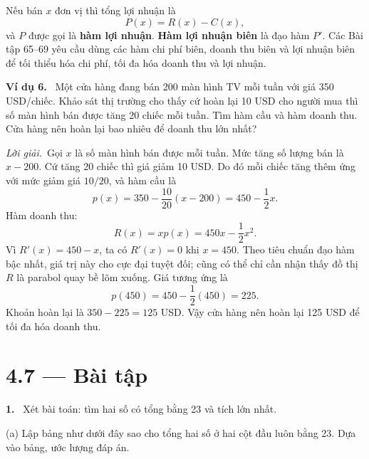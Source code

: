 \documentclass[12pt,a4paper]{article}
\newcommand{\ex}[1]{\par\medskip\noindent\textbf{Ví dụ #1.}\ }
\newcommand{\sol}{\par\nopagebreak[4]\noindent\textit{Lời giải.}\ }
\newcommand{\bt}[1]{\par\smallskip\Needspace{5\baselineskip}\noindent\textbf{#1.}\ }
\begin{document}
Nếu bán $x$ đơn vị thì tổng lợi nhuận là
\[P(x)=R(x)-C(x),\]
và $P$ được gọi là \textbf{hàm lợi nhuận}. \textbf{Hàm lợi nhuận biên} là đạo hàm $P'$. Các Bài tập 65–69 yêu cầu dùng các hàm chi phí biên, doanh thu biên và lợi nhuận biên để tối thiểu hóa chi phí, tối đa hóa doanh thu và lợi nhuận.

\ex{6} Một cửa hàng đang bán 200 màn hình TV mỗi tuần với giá 350 USD/chiếc. Khảo sát thị trường cho thấy cứ hoàn lại 10 USD cho người mua thì số màn hình bán được tăng 20 chiếc mỗi tuần. Tìm hàm cầu và hàm doanh thu. Cửa hàng nên hoàn lại bao nhiêu để doanh thu lớn nhất?
\sol Gọi $x$ là số màn hình bán được mỗi tuần. Mức tăng số lượng bán là $x-200$. Cứ tăng 20 chiếc thì giá giảm 10 USD. Do đó mỗi chiếc tăng thêm ứng với mức giảm giá $10/20$, và hàm cầu là
\[p(x)=350-\frac{10}{20}(x-200)=450-\frac12x.\]
Hàm doanh thu:
\[R(x)=xp(x)=450x-\frac12x^2.\]
Vì $R'(x)=450-x$, ta có $R'(x)=0$ khi $x=450$. Theo tiêu chuẩn đạo hàm bậc nhất, giá trị này cho cực đại tuyệt đối; cũng có thể chỉ cần nhận thấy đồ thị $R$ là parabol quay bề lõm xuống. Giá tương ứng là
\[p(450)=450-\frac12(450)=225.\]
Khoản hoàn lại là $350-225=125$ USD. Vậy cửa hàng nên hoàn lại 125 USD để tối đa hóa doanh thu.

\clearpage
\section*{4.7 — Bài tập}
\bt{1} Xét bài toán: tìm hai số có tổng bằng 23 và tích lớn nhất.

(a) Lập bảng như dưới đây sao cho tổng hai số ở hai cột đầu luôn bằng 23. Dựa vào bảng, ước lượng đáp án.
\end{document}
